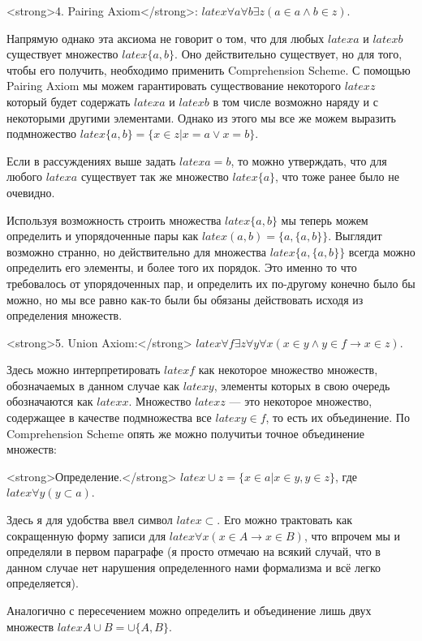 <strong>4. Pairing Axiom</strong>: $latex \forall a \forall b \exists z (a\in a \wedge b \in z)$.

Напрямую однако эта аксиома не говорит о том, что для любых $latex a$ и $latex b$ существует множество $latex \{a, b\}$. Оно действительно существует, но для того, чтобы его получить, необходимо применить Comprehension Scheme. С помощью Pairing Axiom мы можем гарантировать существование некоторого $latex z$ который будет содержать $latex a$ и $latex b$ в том числе возможно наряду и с некоторыми другими элементами. Однако из этого мы все же можем выразить подмножество $latex \{a, b\} = \{x \in z| x = a \vee x = b\}$.

Если в рассуждениях выше задать $latex a = b$, то можно утверждать, что для любого $latex a$ существует так же множество $latex \{a\}$, что тоже ранее было не очевидно.

Используя возможность строить множества $latex \{a, b\}$ мы теперь можем определить и упорядоченные пары как $latex (a, b) = \{a, \{a, b\}\}$. Выглядит возможно странно, но действительно для множества $latex \{a, \{a, b\}\}$ всегда можно определить его элементы, и более того их порядок. Это именно то что требовалось от упорядоченных пар, и определить их по-другому конечно было бы можно, но мы все равно как-то были бы обязаны действовать исходя из определения множеств.

<strong>5. Union Axiom:</strong> $latex \forall f \exists z \forall y \forall x (x \in y \wedge y \in f \rightarrow x \in z)$.

Здесь можно интерпретировать $latex f$ как некоторое множество множеств, обозначаемых в данном случае как $latex y$, элементы которых в свою очередь обозначаются как $latex x$. Множество $latex z$ — это некоторое множество, содержащее в качестве подмножества все $latex y \in f$, то есть их объединение. По Comprehension Scheme опять же можно получитьи точное объединение множеств:

<strong>Определение.</strong> $latex \cup z = \{x \in a|x\in y, y\in z\}$, где $latex \forall y (y \subset a)$.

Здесь я для удобства ввел символ $latex \subset$. Его можно трактовать как сокращенную форму записи для $latex \forall x (x\in A \rightarrow x \in B)$, что впрочем мы и определяли в первом параграфе (я просто отмечаю на всякий случай, что в данном случае нет нарушения определенного нами формализма и всё легко определяется).

Аналогично с пересечением можно определить и объединение лишь двух множеств $latex A\cup B = \cup \{A, B\}$.

